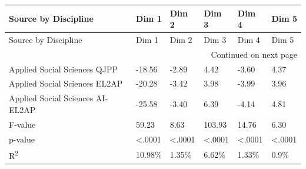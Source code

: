 \begin{longtable}[c]{p{5.5cm}p{1.25cm}p{1.25cm}p{1.25cm}p{1.25cm}p{1.25cm}}
\toprule
Source by Discipline & Dim 1 & Dim 2 & Dim 3 & Dim 4 & Dim 5 \\
\midrule
\endfirsthead
\toprule
Source by Discipline & Dim 1 & Dim 2 & Dim 3 & Dim 4 & Dim 5 \\
\midrule
\endhead
\midrule
\multicolumn{6}{r}{Continued on next page} \\
\midrule
\endfoot
\bottomrule
\endlastfoot
Applied Social Sciences QJPP & -18.56 & -2.89 & 4.42 & -3.60 & 4.37 \\
Applied Social Sciences EL2AP & -20.28 & -3.42 & 3.98 & -3.99 & 3.96 \\
Applied Social Sciences AI-EL2AP & -25.58 & -3.40 & 6.39 & -4.14 & 4.81 \\
\hline
F-value & 59.23 & 8.63 & 103.93 & 14.76 & 6.30 \\
p-value & <.0001 & <.0001 & <.0001 & <.0001 & <.0001 \\
R\textsuperscript{2} & 10.98\% & 1.35\% & 6.62\% & 1.33\% & 0.9\% \\
\end{longtable}

